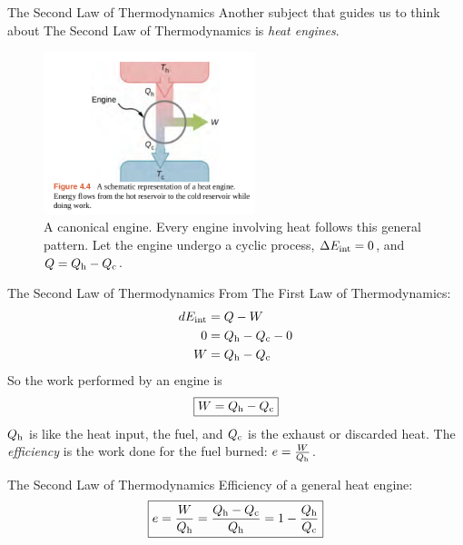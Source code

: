 \documentclass{beamer}
\begin{document}
\begin{frame}{The Second Law of Thermodynamics}
Another subject that guides us to think about The Second Law of Thermodynamics is \textit{heat engines}.
\begin{figure}
\centering
\includegraphics[width=0.55\textwidth]{figures/engine.png}
\caption{\label{fig:engine} A canonical engine.  Every engine involving heat follows this general pattern.  Let the engine undergo a cyclic process, $\Delta E_{\rm int} = 0$, and $Q = Q_{\rm h} - Q_{\rm c}$.}
\end{figure}
\end{frame}

\begin{frame}{The Second Law of Thermodynamics}
From The First Law of Thermodynamics:
\begin{align}
dE_{\rm int} &= Q - W \\
0 &= Q_{\rm h} - Q_{\rm c} - 0 \\
W &= Q_{\rm h} - Q_{\rm c}
\end{align}
So the work performed by an engine is
\begin{equation}
\boxed{W = Q_{\rm h} - Q_{\rm c}}
\end{equation}
$Q_{\rm h}$ is like the heat input, the fuel, and $Q_{\rm c}$ is the exhaust or discarded heat.  The \textit{efficiency} is the work done for the fuel burned: $e = \frac{W}{Q_{\rm h}}$.
\end{frame}

\begin{frame}{The Second Law of Thermodynamics}
Efficiency of a general heat engine:
\begin{equation}
\boxed{
e = \frac{W}{Q_{\rm h}} = \frac{Q_{\rm h}-Q_{\rm c}}{Q_{\rm h}} = 1-\frac{Q_{\rm h}}{Q_{\rm c}}
}
\end{equation}
\end{frame}
\end{document}
